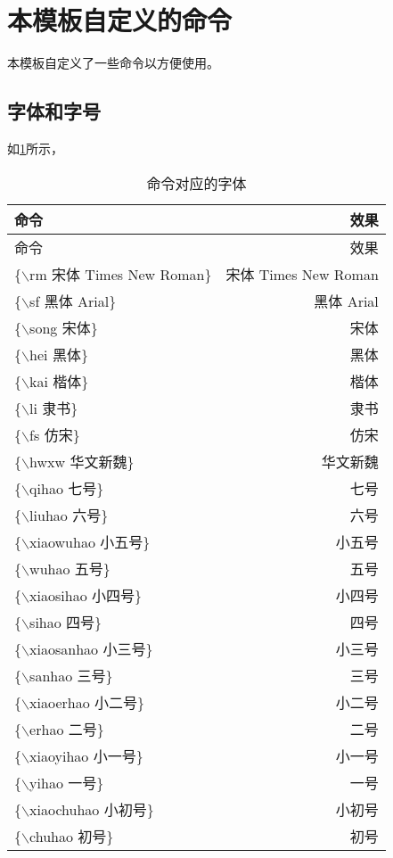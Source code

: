 \section{本模板自定义的命令}
本模板自定义了一些命令以方便使用。

\subsection{字体和字号}
如\cref{zt}所示，
    
\begin{longtable}{lr}
	\caption{命令对应的字体\label{zt}}\\
	\hline
	 命令 & 效果\\
	\hline
	\endfirsthead %
	\hline
	 命令 & 效果\\
	\hline
	\endhead %
	\hline   %
	\endfoot %
	\{$\backslash$rm 宋体 Times New Roman\} & {\rm 宋体 Times New Roman}\\
	\{$\backslash$sf 黑体 Arial\} & {\sf 黑体 Arial}\\
	\{$\backslash$song 宋体\} & {\song 宋体}\\
	\{$\backslash$hei 黑体\} & {\hei 黑体}\\
	\{$\backslash$kai 楷体\} & {\kai 楷体}\\
	\{$\backslash$li 隶书\} & {\li 隶书}\\
	\{$\backslash$fs 仿宋\} & {\fs 仿宋}\\ 
	\{$\backslash$hwxw 华文新魏\} &{\hwxw 华文新魏}\\
	\{$\backslash$qihao 七号\} & {\qihao 七号}\\
	\{$\backslash$liuhao 六号\} & {\liuhao 六号}\\
	\{$\backslash$xiaowuhao 小五号\} & {\xiaowuhao 小五号}\\
	\{$\backslash$wuhao 五号\} & {\wuhao 五号}\\
	\{$\backslash$xiaosihao 小四号\} & {\xiaosihao 小四号}\\
	\{$\backslash$sihao 四号\} & {\sihao 四号}\\
	\{$\backslash$xiaosanhao 小三号\} & {\xiaosanhao 小三号}\\
	\{$\backslash$sanhao 三号\} & {\sanhao 三号}\\
	\{$\backslash$xiaoerhao 小二号\} & {\xiaoerhao 小二号}\\
	\{$\backslash$erhao 二号\} & {\erhao 二号}\\
	\{$\backslash$xiaoyihao 小一号\} & {\xiaoyihao 小一号}\\
	\{$\backslash$yihao 一号\} & {\yihao 一号}\\
	\{$\backslash$xiaochuhao 小初号\} & {\xiaochuhao 小初号}\\
	\{$\backslash$chuhao 初号\} & {\chuhao 初号} \\
\end{longtable}

